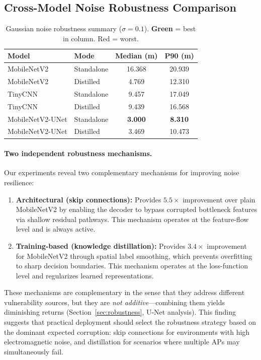 \documentclass[11pt,a4paper]{article}
\newcommand{\best}[1]{\textcolor{bestcolor}{\textbf{#1}}}
\newcommand{\worst}[1]{\textcolor{worstcolor}{#1}}
\begin{document}
\subsection{Cross-Model Noise Robustness Comparison}

\begin{table}[H]
\centering
\caption{Gaussian noise robustness summary ($\sigma = 0.1$). \best{Green} = best in column. \worst{Red} = worst.}
\label{tab:noise_summary}
\begin{tabular}{@{}llcc@{}}
\toprule
\textbf{Model} & \textbf{Mode} & \textbf{Median (m)} & \textbf{P90 (m)} \\
\midrule
MobileNetV2       & Standalone & \worst{16.368} & \worst{20.939} \\
MobileNetV2       & Distilled  & 4.769  & 12.310 \\
TinyCNN           & Standalone & 9.457  & 17.049 \\
TinyCNN           & Distilled  & 9.439  & 16.568 \\
MobileNetV2-UNet  & Standalone & \best{3.000}  & \best{8.310}  \\
MobileNetV2-UNet  & Distilled  & 3.469  & 10.473 \\
\bottomrule
\end{tabular}
\end{table}

\paragraph{Two independent robustness mechanisms.}
Our experiments reveal two complementary mechanisms for improving noise resilience:
\begin{enumerate}[nosep]
  \item \textbf{Architectural (skip connections):} Provides $5.5\times$ improvement over plain MobileNetV2 by enabling the decoder to bypass corrupted bottleneck features via shallow residual pathways. This mechanism operates at the feature-flow level and is always active.
  \item \textbf{Training-based (knowledge distillation):} Provides $3.4\times$ improvement for MobileNetV2 through spatial label smoothing, which prevents overfitting to sharp decision boundaries. This mechanism operates at the loss-function level and regularizes learned representations.
\end{enumerate}
These mechanisms are complementary in the sense that they address different vulnerability sources, but they are \emph{not additive}---combining them yields diminishing returns (Section~\ref{sec:robustness}, U-Net analysis).
This finding suggests that practical deployment should select the robustness strategy based on the dominant expected corruption:
skip connections for environments with high electromagnetic noise,
and distillation for scenarios where multiple APs may simultaneously fail.
\end{document}

